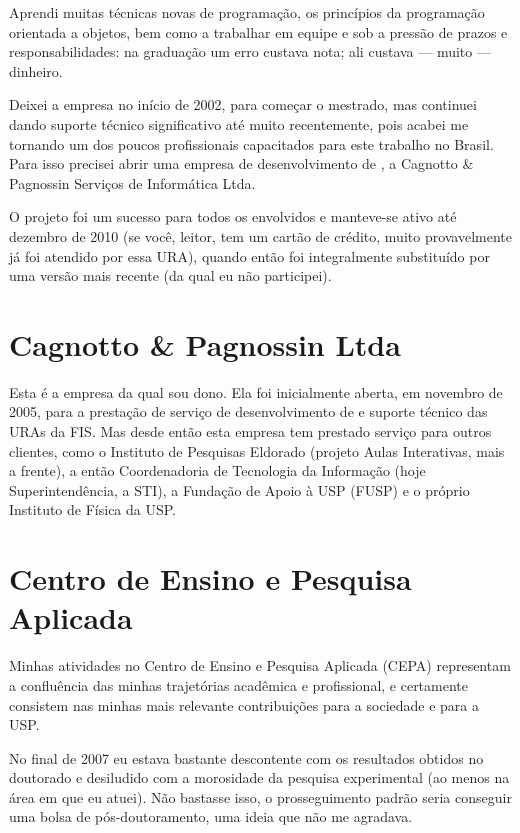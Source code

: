 Aprendi muitas técnicas novas de programação, os princípios da programação orientada a objetos, bem como a trabalhar em equipe e sob a pressão de prazos e responsabilidades: na graduação um erro custava nota; ali custava --- muito --- dinheiro.

Deixei a empresa no início de 2002, para começar o mestrado, mas continuei dando suporte técnico significativo até muito recentemente, pois acabei me tornando um dos poucos profissionais capacitados para este trabalho no Brasil. Para isso precisei abrir uma empresa de desenvolvimento de , a Cagnotto \& Pagnossin Serviços de Informática Ltda.

O projeto foi um sucesso para todos os envolvidos e manteve-se ativo até dezembro de 2010 (se você, leitor, tem um cartão de crédito, muito provavelmente já foi atendido por essa URA), quando então foi integralmente substituído por uma versão mais recente (da qual eu não participei).

\section{Cagnotto \& Pagnossin Ltda}

Esta é a empresa da qual sou dono. Ela foi inicialmente aberta, em novembro de 2005, para a prestação de serviço de desenvolvimento de  e suporte técnico das URAs da FIS. Mas desde então esta empresa tem prestado serviço para outros clientes, como o Instituto de Pesquisas Eldorado (projeto Aulas Interativas, mais a frente), a então Coordenadoria de Tecnologia da Informação (hoje Superintendência, a STI), a Fundação de Apoio à USP (FUSP) e o próprio Instituto de Física da USP.

\section{Centro de Ensino e Pesquisa Aplicada}
\label{sec:cepa}

Minhas atividades no Centro de Ensino e Pesquisa Aplicada (CEPA) representam a confluência das minhas trajetórias acadêmica e profissional, e certamente consistem nas minhas mais relevante contribuições para a sociedade e para a USP.

No final de 2007 eu estava bastante descontente com os resultados obtidos no doutorado e desiludido com a morosidade da pesquisa experimental (ao menos na área em que eu atuei). Não bastasse isso, o prosseguimento padrão seria conseguir uma bolsa de pós-doutoramento, uma ideia que não me agradava.

